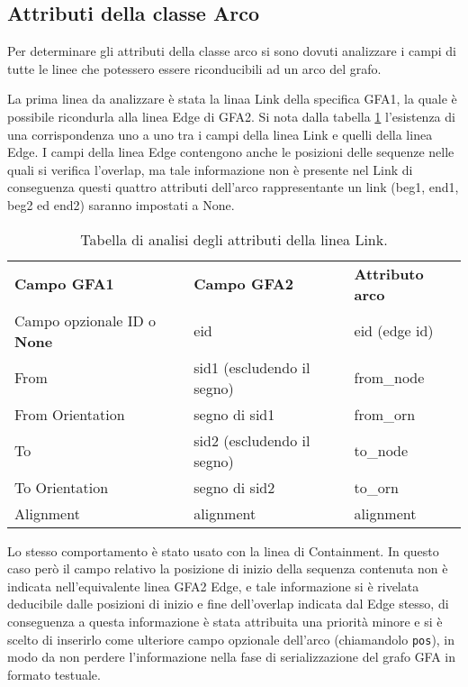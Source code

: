 \subsection{Attributi della classe Arco}
Per determinare gli attributi della classe arco si sono dovuti analizzare i campi
di tutte le linee che potessero essere riconducibili ad un arco del grafo.

La prima linea da analizzare è stata la linaa Link della specifica GFA1, la quale è
possibile ricondurla alla linea Edge di GFA2. Si nota dalla tabella \ref{tab:link-analysis}
l'esistenza di una corrispondenza uno a uno tra i campi della linea Link e quelli
della linea Edge. I campi della linea Edge contengono anche le posizioni
delle sequenze nelle quali si verifica l'overlap, ma tale informazione non è presente
nel Link di conseguenza questi quattro attributi dell'arco rappresentante un link
(beg1, end1, beg2 ed end2) saranno impostati a None.

\noindent
\begin{table}[h]
	\begin{tabularx}{\textwidth}{ | X | X | X |}
		\hline
		\textbf{Campo GFA1}	&	\textbf{Campo GFA2}			&	\textbf{Attributo arco}\\
		Campo opzionale ID o	\mbox{\textbf{None}}				&	eid					&	eid (edge id)\\
		From				&	sid1 (escludendo il segno)		&	from\_node\\
		From Orientation		&	segno di sid1					&	from\_orn\\
		To					&	sid2 (escludendo il segno)		&	to\_node\\
		To Orientation			&	segno di sid2					&	to\_orn\\
		Alignment				&	alignment						&	alignment\\
		\hline
	\end{tabularx}
	\caption{Tabella di analisi degli attributi della linea Link.}
	\label{tab:link-analysis}
\end{table}

Lo stesso comportamento è stato usato con la linea di Containment. In questo
caso però il campo relativo la posizione di inizio della sequenza contenuta non
è indicata nell'equivalente linea GFA2 Edge, e tale informazione
si è rivelata deducibile dalle posizioni di inizio e fine dell'overlap
indicata dal Edge stesso, di conseguenza a questa informazione è stata attribuita
una priorità minore e si è scelto di inserirlo come ulteriore campo opzionale dell'arco (chiamandolo
\texttt{pos}),
in modo da non perdere l'informazione nella fase di serializzazione
del grafo GFA in formato testuale.

